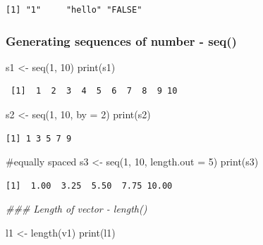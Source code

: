 \documentclass[
  letterpaper,
  DIV=11,
  numbers=noendperiod]{scrartcl}
\newenvironment{Shaded}{\begin{snugshade}}{\end{snugshade}}
\newcommand{\AttributeTok}[1]{\textcolor[rgb]{0.40,0.45,0.13}{#1}}
\newcommand{\CommentTok}[1]{\textcolor[rgb]{0.37,0.37,0.37}{#1}}
\newcommand{\DecValTok}[1]{\textcolor[rgb]{0.68,0.00,0.00}{#1}}
\newcommand{\DocumentationTok}[1]{\textcolor[rgb]{0.37,0.37,0.37}{\textit{#1}}}
\newcommand{\FunctionTok}[1]{\textcolor[rgb]{0.28,0.35,0.67}{#1}}
\newcommand{\NormalTok}[1]{\textcolor[rgb]{0.00,0.23,0.31}{#1}}
\newcommand{\OtherTok}[1]{\textcolor[rgb]{0.00,0.23,0.31}{#1}}
\begin{document}
\begin{verbatim}
[1] "1"     "hello" "FALSE"
\end{verbatim}

\subsubsection{Generating sequences of number -
seq()}\label{generating-sequences-of-number---seq}

\begin{Shaded}
\begin{Highlighting}[]
\NormalTok{s1 }\OtherTok{\textless{}{-}} \FunctionTok{seq}\NormalTok{(}\DecValTok{1}\NormalTok{, }\DecValTok{10}\NormalTok{)}
\FunctionTok{print}\NormalTok{(s1)}
\end{Highlighting}
\end{Shaded}

\begin{verbatim}
 [1]  1  2  3  4  5  6  7  8  9 10
\end{verbatim}

\begin{Shaded}
\begin{Highlighting}[]
\NormalTok{s2 }\OtherTok{\textless{}{-}} \FunctionTok{seq}\NormalTok{(}\DecValTok{1}\NormalTok{, }\DecValTok{10}\NormalTok{, }\AttributeTok{by =} \DecValTok{2}\NormalTok{)}
\FunctionTok{print}\NormalTok{(s2)}
\end{Highlighting}
\end{Shaded}

\begin{verbatim}
[1] 1 3 5 7 9
\end{verbatim}

\begin{Shaded}
\begin{Highlighting}[]
\CommentTok{\#equally spaced}
\NormalTok{s3 }\OtherTok{\textless{}{-}} \FunctionTok{seq}\NormalTok{(}\DecValTok{1}\NormalTok{, }\DecValTok{10}\NormalTok{, }\AttributeTok{length.out =} \DecValTok{5}\NormalTok{)}
\FunctionTok{print}\NormalTok{(s3)}
\end{Highlighting}
\end{Shaded}

\begin{verbatim}
[1]  1.00  3.25  5.50  7.75 10.00
\end{verbatim}

\begin{Shaded}
\begin{Highlighting}[]
\DocumentationTok{\#\#\# Length of vector {-} length()}

\NormalTok{l1 }\OtherTok{\textless{}{-}} \FunctionTok{length}\NormalTok{(v1)}
\FunctionTok{print}\NormalTok{(l1)}
\end{Highlighting}
\end{Shaded}
\end{document}
